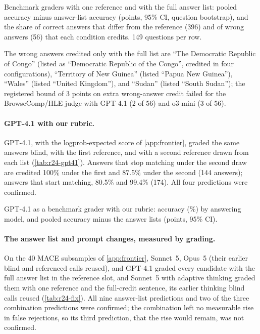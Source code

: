 \begin{table}[htbp]
\centering
\caption{Benchmark graders with one reference and with the full answer list: pooled accuracy minus answer-list accuracy (points, 95\% CI, question bootstrap), and the share of correct answers that differ from the reference (396) and of wrong answers (56) that each condition credits. 149 questions per row.\pre}
\label{tab:r24-standard}
\footnotesize
\setlength{\tabcolsep}{3pt}
\begin{adjustbox}{max width=\linewidth}\end{adjustbox}
\end{table}

The wrong answers credited only with the full list are ``The Democratic Republic of Congo'' (listed as ``Democratic Republic of the Congo'', credited in four configurations), ``Territory of New Guinea'' (listed ``Papua New Guinea''), ``Wales'' (listed ``United Kingdom''), and ``Sudan'' (listed ``South Sudan''); the registered bound of 3 points on extra wrong-answer credit failed for the BrowseComp/HLE judge with GPT-4.1 (2 of 56) and o3-mini (3 of 56).

\paragraph{GPT-4.1 with our rubric.} GPT-4.1, with the logprob-expected score of \cref{app:frontier}, graded the same answers blind, with the first reference, and with a second reference drawn from each list (\cref{tab:r24-gpt41}). Answers that stop matching under the second draw are credited 100\% under the first and 87.5\% under the second (144 answers); answers that start matching, 80.5\% and 99.4\% (174). All four predictions were confirmed.

\begin{table}[htbp]
\centering
\caption{GPT-4.1 as a benchmark grader with our rubric: accuracy (\%) by answering model, and pooled accuracy minus the answer lists (points, 95\% CI).\pre}
\label{tab:r24-gpt41}
\footnotesize

\end{table}

\paragraph{The answer list and prompt changes, measured by grading.} On the 40 \textsc{MACE} subsamples of \cref{app:frontier}, Sonnet~5, Opus~5 (their earlier blind and referenced calls reused), and GPT-4.1 graded every candidate with the full answer list in the reference slot, and Sonnet~5 with adaptive thinking graded them with one reference and the full-credit sentence, its earlier thinking blind calls reused (\cref{tab:r24-fix}). All nine answer-list predictions and two of the three combination predictions were confirmed; the combination left no measurable rise in false rejections, so its third prediction, that the rise would remain, was not confirmed.

